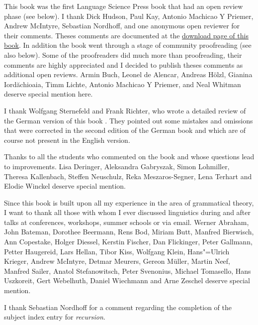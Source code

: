 This book was the first Language Science Press book that had an open review phase (see below). I
thank Dick Hudson, Paul Kay, Antonio Machicao Y Priemer, Andrew McIntyre, Sebastian Nordhoff, and one anonymous open
reviewer for their comments. Theses comments are documented at the \href{\lsURL}{download page of
  this book}. In addition the book went through a stage of community proofreading (see also
below). Some of the proofreaders did much more than proofreading, their comments are highly
appreciated and I decided to publish theses comments as additional open reviews.
Armin Buch, 
Leonel de Alencar,
Andreas Hölzl,
Gianina Iordăchioaia,
Timm Lichte,
Antonio Machicao Y Priemer, and
Neal Whitman
deserve special mention here.


I thank Wolfgang Sternefeld and Frank Richter, who wrote a detailed review of the German version of
this book \citep{SR2012a}. They pointed out some mistakes and omissions that were corrected in the second edition
of the German book and which are of course not present in the English version.

Thanks to all the students who commented on the book and whose questions lead to improvements. 
Lisa Deringer,
Aleksandra Gabryszak, %
Simon Lohmiller, %
Theresa Kallenbach, %
Steffen Neu\-schulz,  %
Reka Meszaros-Segner,
Lena Terhart and
Elodie Winckel deserve special mention.

Since this book is built upon all my experience in the area of grammatical theory, I want to thank
all those with whom I ever discussed linguistics during and after talks at conferences, workshops,
summer schools or via email.
Werner Abraham,
John Bateman,
Dorothee Beermann, 
Rens Bod, 
Miriam Butt,
Manfred Bierwisch,
Ann Copestake, 
Holger Diessel, 
Kerstin Fischer,
Dan Flickinger,
Peter Gallmann, 
Petter Haugereid,
Lars Hellan, 
Tibor Kiss,
Wolfgang Klein, 
Hans"=Ulrich Krieger,
Andrew McIntyre,
Detmar Meurers,
Gereon Müller,
Martin Neef,
Manfred Sailer, 
Anatol Stefanowitsch,
Peter Svenonius,
Michael Tomasello, 
Hans Uszkoreit, 
Gert Webelhuth, 
Daniel Wiechmann and Arne Zeschel deserve special mention.

I thank Sebastian Nordhoff for a comment regarding the completion of the subject index entry for \emph{recursion}.

